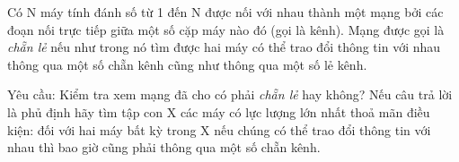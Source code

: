 Có N máy tính đánh số từ 1 đến N được nối với nhau thành một mạng bởi các đoạn nối trực tiếp giữa một số cặp máy nào đó (gọi là kênh). Mạng   được gọi là   \emph{    chẵn lẻ   }   nếu như trong nó tìm được hai máy có thể trao đổi thông tin với nhau thông qua một số chẵn kênh cũng như thông qua một   số lẻ kênh.  

   Yêu cầu: Kiểm tra xem mạng đã cho có phải   \emph{    chẵn lẻ   }   hay không? Nếu câu trả lời là phủ định hãy tìm tập con X các máy có lực lượng lớn   nhất thoả mãn điều kiện: đối với hai máy bất kỳ trong X nếu chúng có thể trao đổi thông tin với nhau thì bao giờ cũng phải thông qua một số chẵn kênh.